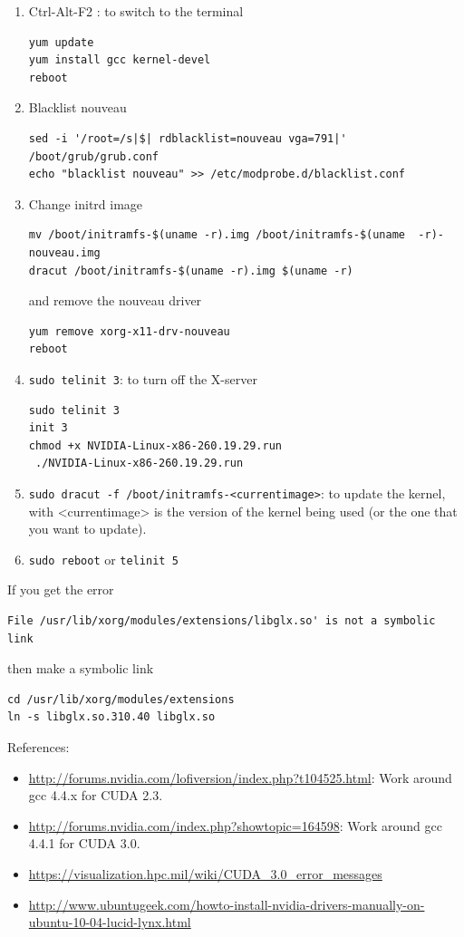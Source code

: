 \begin{enumerate}
  \item Ctrl-Alt-F2 : to switch to the terminal  
  \begin{verbatim}
yum update
yum install gcc kernel-devel
reboot
  \end{verbatim}
  \item Blacklist nouveau
\begin{verbatim}
sed -i '/root=/s|$| rdblacklist=nouveau vga=791|' /boot/grub/grub.conf
echo "blacklist nouveau" >> /etc/modprobe.d/blacklist.conf
\end{verbatim}
  \item Change initrd image
\begin{verbatim}
mv /boot/initramfs-$(uname -r).img /boot/initramfs-$(uname  -r)-nouveau.img
dracut /boot/initramfs-$(uname -r).img $(uname -r)
\end{verbatim}
and remove the nouveau driver
\begin{verbatim}
yum remove xorg-x11-drv-nouveau
reboot
\end{verbatim}
  \item \verb!sudo telinit 3!: to turn off the X-server
\begin{verbatim}
sudo telinit 3
init 3
chmod +x NVIDIA-Linux-x86-260.19.29.run
 ./NVIDIA-Linux-x86-260.19.29.run
\end{verbatim}
  \item \verb!sudo dracut -f /boot/initramfs-<currentimage>!: to update the
  kernel, with <currentimage> is the version of the kernel being used (or the
  one that you want to update).
  \item \verb!sudo reboot! or \verb!telinit 5!
\end{enumerate}

If you get the error
\begin{verbatim}
File /usr/lib/xorg/modules/extensions/libglx.so' is not a symbolic link
\end{verbatim}
then make a symbolic link
\begin{verbatim}
cd /usr/lib/xorg/modules/extensions
ln -s libglx.so.310.40 libglx.so
\end{verbatim}

References:
\begin{itemize}
\item
  \url{http://forums.nvidia.com/lofiversion/index.php?t104525.html}:
  Work around gcc 4.4.x for CUDA 2.3.
\item \url{http://forums.nvidia.com/index.php?showtopic=164598}: Work
  around gcc 4.4.1 for CUDA 3.0.
\item \url{https://visualization.hpc.mil/wiki/CUDA_3.0_error_messages}
\item \url{http://www.ubuntugeek.com/howto-install-nvidia-drivers-manually-on-ubuntu-10-04-lucid-lynx.html}
\end{itemize}

